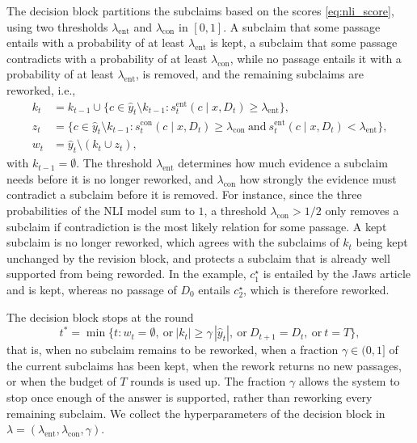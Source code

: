 The decision block partitions the subclaims based on the scores \eqref{eq:nli_score}, using two thresholds $\lambda_{\mathrm{ent}}$ and $\lambda_{\mathrm{con}}$ in $[0, 1]$. A subclaim that some passage entails with a probability of at least $\lambda_{\mathrm{ent}}$ is kept, a subclaim that some passage contradicts with a probability of at least $\lambda_{\mathrm{con}}$, while no passage entails it with a probability of at least $\lambda_{\mathrm{ent}}$, is removed, and the remaining subclaims are reworked, i.e.,
\begin{align}
  k_t &= k_{t-1} \cup \bigl\{ c \in \hat{y}_t \setminus k_{t-1} : s^{\mathrm{ent}}_t(c \mid x, D_t) \geq \lambda_{\mathrm{ent}} \bigr\}, \label{eq:keep} \\
  z_t &= \bigl\{ c \in \hat{y}_t \setminus k_{t-1} : s^{\mathrm{con}}_t(c \mid x, D_t) \geq \lambda_{\mathrm{con}} \ \text{and} \ s^{\mathrm{ent}}_t(c \mid x, D_t) < \lambda_{\mathrm{ent}} \bigr\}, \label{eq:removal} \\
  w_t &= \hat{y}_t \setminus (k_t \cup z_t), \label{eq:rework}
\end{align}
with $k_{t-1} = \emptyset$. The threshold $\lambda_{\mathrm{ent}}$ determines how much evidence a subclaim needs before it is no longer reworked, and $\lambda_{\mathrm{con}}$ how strongly the evidence must contradict a subclaim before it is removed. For instance, since the three probabilities of the NLI model sum to $1$, a threshold $\lambda_{\mathrm{con}} > 1/2$ only removes a subclaim if contradiction is the most likely relation for some passage. A kept subclaim is no longer reworked, which agrees with the subclaims of $k_t$ being kept unchanged by the revision block, and protects a subclaim that is already well supported from being reworded. In the example, $c^{\star}_1$ is entailed by the Jaws article and is kept, whereas no passage of $D_0$ entails $c^{\star}_2$, which is therefore reworked.

The decision block stops at the round
\begin{equation}
  t^* = \min\bigl\{ t : w_t = \emptyset, \ \text{or} \ |k_t| \geq \gamma\, |\hat{y}_t|, \ \text{or} \ D_{t+1} = D_t, \ \text{or} \ t = T \bigr\},
  \label{eq:stop}
\end{equation}
that is, when no subclaim remains to be reworked, when a fraction $\gamma \in (0, 1]$ of the current subclaims has been kept, when the rework returns no new passages, or when the budget of $T$ rounds is used up. The fraction $\gamma$ allows the system to stop once enough of the answer is supported, rather than reworking every remaining subclaim. We collect the hyperparameters of the decision block in $\lambda = (\lambda_{\mathrm{ent}}, \lambda_{\mathrm{con}}, \gamma)$.

